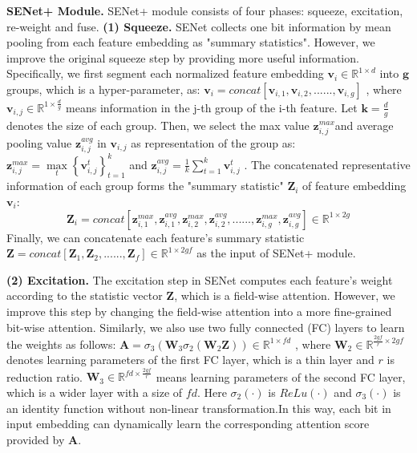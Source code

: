 \documentclass[sigconf]{acmart}
\begin{document}
\textbf{SENet+ Module.}
SENet+ module consists of four phases: squeeze, excitation, re-weight and fuse.
\textbf{(1) Squeeze.} SENet collects one bit information by mean pooling from each feature embedding as  "summary statistics". However, we improve the original squeeze step by providing more useful information. Specifically, we first segment each normalized feature embedding $\mathbf{v}_{i} \in\mathbb{R}^{1\times d}$ into $\mathbf g $  groups, which is a hyper-parameter, as:
 $\mathbf{v}_i = concat[\mathbf{v}_{i,1},\mathbf{v}_{i,2},......,\mathbf{v}_{i,g}] $
, where $\mathbf{v}_{i,j}\in \mathbb{R}^{1\times \frac{d}{g}}$ means information in the j-th group of the i-th feature. Let $\mathbf{k}=\frac{d}{g} $ denotes the size of each group. Then, we select the max value  $\mathbf{z}_{i,j}^{max}$and average pooling value $\mathbf{z}_{i,j}^{avg}$ in $\mathbf{v}_{i,j}$ as representation of the group as:
$\mathbf{z}_{i,j}^{max} = \max \limits_{t} \left\{ \mathbf{v}_{i,j}^t \right\}_{t=1}^{k}$ and $
          \mathbf{z}_{i,j}^{avg} =\frac{1}{k}\sum_{t=1}^k \mathbf{v}_{i,j}^t$
. The concatenated representative information of each group forms the "summary statistic" $\mathbf{Z}_{i} $ of feature embedding  $\mathbf{v}_{i} $:
\begin{equation}
         \mathbf{Z}_{i} = concat[\mathbf{z}_{i,1}^{max},\mathbf{z}_{i,1}^{avg},\mathbf{z}_{i,2}^{max},\mathbf{z}_{i,2}^{avg},......,\mathbf{z}_{i,g}^{max},\mathbf{z}_{i,g}^{avg}] \in \mathbb{R}^{1\times 2g}
 \end{equation}
Finally, we can concatenate each feature's summary statistic 
$\mathbf{Z} = concat[\mathbf{Z}_{1},\mathbf{Z}_{2},......,\mathbf{Z}_{f}] \in \mathbb{R}^{1\times 2gf}$
as the input of SENet+ module.

\textbf{(2) Excitation.} The excitation step in SENet computes each feature's weight according to the statistic vector $\mathbf{Z} $, which is a field-wise attention.  However, we improve this step by changing the field-wise attention into a more fine-grained bit-wise attention. Similarly, we also use two fully connected (FC) layers to learn the weights as follows:
$\mathbf{A} = \sigma_3\left(\mathbf{W}_{3}\sigma_2\left(\mathbf{W}_{2}\mathbf{Z}\right )\right)\in \mathbb{R}^{1\times fd}$
, where  $\mathbf{W}_2 \in \mathbb{R}^{ \frac{2gf}{r}\times 2gf} $ denotes 
learning parameters of the first FC layer, which is a thin layer and $r$ is reduction ratio. $\mathbf{W}_3 \in \mathbb{R}^{ fd \times\frac{2gf}{r}} $ means learning parameters of the second FC layer, which is a wider layer with a size of $fd$. Here $\sigma_2\left(\cdot\right) $ is  $ReLu \left(\cdot\right)$ and $\sigma_3\left(\cdot\right) $ is an identity function without non-linear transformation.In this way, each bit in input embedding can dynamically learn the corresponding attention score provided by $\mathbf{A}$. 
\end{document}
